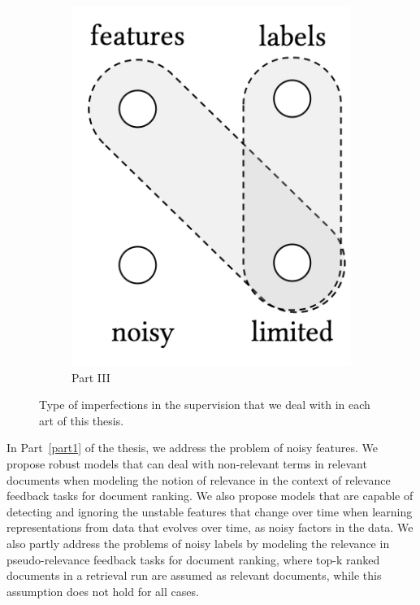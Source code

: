 \begin{figure}[t]
\begin{subfigure}[b]{0.32\textwidth}
    \centering
        \includegraphics[width=0.55\linewidth]{01-introduction/figs_and_tables/fig_p3.png}
        \caption{\label{fig:p3}Part III}
    \end{subfigure}
\caption{\label{fig:thesis_parts}Type of imperfections in the supervision that we deal with in each art of this thesis.}
\end{figure}

In Part~\ref{part1} of the thesis, we address the problem of noisy features. We propose robust models that can deal with non-relevant terms in relevant documents when modeling the notion of relevance in the context of relevance feedback tasks for document ranking. We also propose models that are capable of detecting and ignoring the unstable features that change over time when learning representations from data that evolves over time, as noisy factors in the data. We also partly address the problems of noisy labels by modeling the relevance in pseudo-relevance feedback tasks for document ranking, where top-k ranked documents in a retrieval run are assumed as relevant documents, while this assumption does not hold for all cases.

